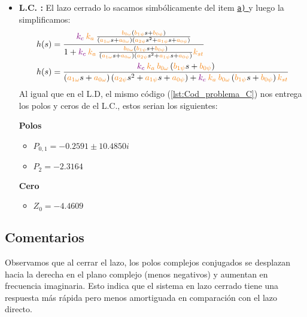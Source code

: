 \begin{itemize}
    \item \textbf{L.C. :} El lazo cerrado lo sacamos simbólicamente del item \hyperref[pregunta-a]{\texttt{a)} } y luego la simplificamos:
    \begin{align*}
        &h(s) = \dfrac{\mora{k_c} \nara{k_a} \frac{\nara{\nara{b_{0\omega}}}\left(\nara{b_{1\psi}}s + \nara{b_{0\psi}}\right)}
        {\left(\nara{a_{1\omega}}s + \nara{a_{0\omega}}\right)\left(\nara{a_{2\psi}}s^{2} + \nara{a_{1\psi}}s + \nara{a_{0\psi}}\right)}}{1+\mora{k_c} \nara{k_a} \frac{\nara{\nara{b_{0\omega}}}\left(\nara{b_{1\psi}}s + \nara{b_{0\psi}}\right)}
        {\left(\nara{a_{1\omega}}s + \nara{a_{0\omega}}\right)\left(\nara{a_{2\psi}}s^{2} + \nara{a_{1\psi}}s + \nara{a_{0\psi}}\right)}\nara{k_{st}}} \\
        &h(s) = \dfrac{     \mora{k_c} \nara{k_a}    \nara{\nara{b_{0\omega}}}\left(\nara{b_{1\psi}}s + \nara{b_{0\psi}}\right) }  {     \left(\nara{a_{1\omega}}s + \nara{a_{0\omega}}\right)\left(\nara{a_{2\psi}}s^{2} + \nara{a_{1\psi}}s + \nara{a_{0\psi}}\right)    + \mora{k_c} \nara{k_a}     \nara{\nara{b_{0\omega}}}\left(\nara{b_{1\psi}}s + \nara{b_{0\psi}}\right)   
       \nara{k_{st}}}
    \end{align*}
    Al igual que en el L.D, el mismo código (\autoref{lst:Cod_problema_C}) nos entrega los polos y ceros de el L.C., estos serian los siguientes:
    \begin{multicols}{2}
        \textbf{Polos}
        \begin{itemize}
            \item \(P_{0,1} = -0.2591 \pm 10.4850i\) 
            \item \(P_2 = -2.3164 \)
        \end{itemize}
        \columnbreak
        \textbf{Cero}
        \begin{itemize}
            \item \(Z_0 = -4.4609\)
        \end{itemize}
      \end{multicols}
\end{itemize}





\FloatBarrier
\subsection{Comentarios}


Observamos que al cerrar el lazo, los polos complejos conjugados se desplazan hacia la derecha en el plano complejo (menos negativos) y aumentan en frecuencia imaginaria. Esto indica que el sistema en lazo cerrado tiene una respuesta más rápida pero menos amortiguada en comparación con el lazo directo.

